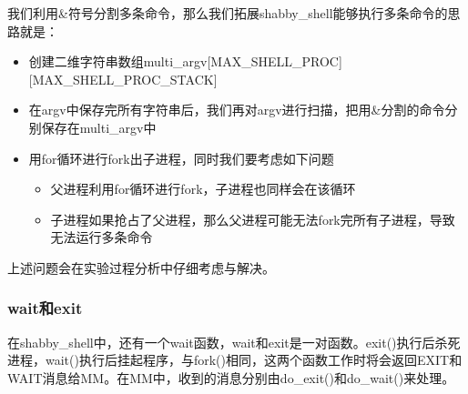 \documentclass{whureport}
\begin{document}
我们利用\&符号分割多条命令，那么我们拓展shabby\_shell能够执行多条命令的思路就是：\begin{itemize}
\item 创建二维字符串数组multi\_argv[MAX\_SHELL\_PROC][MAX\_SHELL\_PROC\_STACK]
  \item 在argv中保存完所有字符串后，我们再对argv进行扫描，把用\&分割的命令分别保存在multi\_argv中
  \item 用for循环进行fork出子进程，同时我们要考虑如下问题
  \begin{itemize}
  \item 父进程利用for循环进行fork，子进程也同样会在该循环
  \item 子进程如果抢占了父进程，那么父进程可能无法fork完所有子进程，导致无法运行多条命令
\end{itemize}

\end{itemize}

上述问题会在实验过程分析中仔细考虑与解决。

\subsubsection{wait和exit}
在shabby\_shell中，还有一个wait函数，wait和exit是一对函数。exit()执行后杀死进程，wait()执行后挂起程序，与fork()相同，这两个函数工作时将会返回EXIT和WAIT消息给MM。在MM中，收到的消息分别由do\_exit()和do\_wait()来处理。
\end{document}
